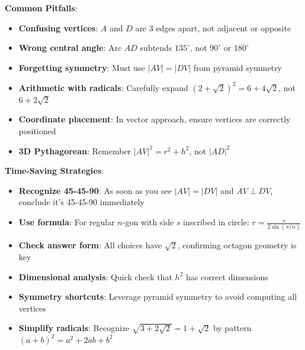 \documentclass[12pt]{article}
\begin{document}
\begin{warning}
\textbf{Common Pitfalls}:
\begin{itemize}
    \item \textbf{Confusing vertices}: $A$ and $D$ are 3 edges apart, not adjacent or opposite
    \item \textbf{Wrong central angle}: Arc $AD$ subtends $135^\circ$, not $90^\circ$ or $180^\circ$
    \item \textbf{Forgetting symmetry}: Must use $|AV| = |DV|$ from pyramid symmetry
    \item \textbf{Arithmetic with radicals}: Carefully expand $(2+\sqrt{2})^2 = 6 + 4\sqrt{2}$, not $6 + 2\sqrt{2}$
    \item \textbf{Coordinate placement}: In vector approach, ensure vertices are correctly positioned
    \item \textbf{3D Pythagorean}: Remember $|AV|^2 = r^2 + h^2$, not $|AD|^2$
\end{itemize}
\end{warning}

\begin{protip}
\textbf{Time-Saving Strategies}:
\begin{itemize}
    \item \textbf{Recognize 45-45-90}: As soon as you see $|AV| = |DV|$ and $AV \perp DV$, conclude it's 45-45-90 immediately
    \item \textbf{Use formula}: For regular $n$-gon with side $s$ inscribed in circle: $r = \frac{s}{2\sin(\pi/n)}$
    \item \textbf{Check answer form}: All choices have $\sqrt{2}$, confirming octagon geometry is key
    \item \textbf{Dimensional analysis}: Quick check that $h^2$ has correct dimensions
    \item \textbf{Symmetry shortcuts}: Leverage pyramid symmetry to avoid computing all vertices
    \item \textbf{Simplify radicals}: Recognize $\sqrt{3+2\sqrt{2}} = 1 + \sqrt{2}$ by pattern $(a+b)^2 = a^2 + 2ab + b^2$
\end{itemize}
\end{protip}
\end{document}
